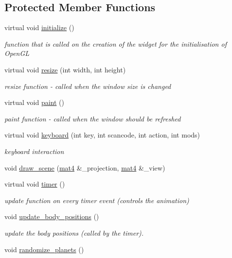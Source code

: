 \subsection*{Protected Member Functions}
\begin{DoxyCompactItemize}
\item 
virtual void \hyperlink{classSolar__viewer_ad995310e4ede7e0ade07a6b6fb799488}{initialize} ()
\begin{DoxyCompactList}\small\item\em function that is called on the creation of the widget for the initialisation of Open\+GL \end{DoxyCompactList}\item 
virtual void \hyperlink{classSolar__viewer_a40df69388b641e5982f0975d711ae3ca}{resize} (int width, int height)
\begin{DoxyCompactList}\small\item\em resize function -\/ called when the window size is changed \end{DoxyCompactList}\item 
virtual void \hyperlink{classSolar__viewer_ab0c48ceb8d58aefee8c5528c9efa6412}{paint} ()
\begin{DoxyCompactList}\small\item\em paint function -\/ called when the window should be refreshed \end{DoxyCompactList}\item 
virtual void \hyperlink{classSolar__viewer_aaf4e3bd2fd0dea72ffafe050a3c2ef7f}{keyboard} (int key, int scancode, int action, int mods)
\begin{DoxyCompactList}\small\item\em keyboard interaction \end{DoxyCompactList}\item 
void \hyperlink{classSolar__viewer_af6b468fb543b9c9ed466fe1687f1aff8}{draw\+\_\+scene} (\hyperlink{classmat4}{mat4} \&\+\_\+projection, \hyperlink{classmat4}{mat4} \&\+\_\+view)
\item 
virtual void \hyperlink{classSolar__viewer_a1b9915ee3f62232328c7326753c11101}{timer} ()
\begin{DoxyCompactList}\small\item\em update function on every timer event (controls the animation) \end{DoxyCompactList}\item 
void \hyperlink{classSolar__viewer_ab86b680afd2e29e8ead0ae9bdb2cef48}{update\+\_\+body\+\_\+positions} ()
\begin{DoxyCompactList}\small\item\em update the body positions (called by the timer). \end{DoxyCompactList}\item 
void \hyperlink{classSolar__viewer_aa88b398265ff4e938fd522426e1d7333}{randomize\+\_\+planets} ()
\end{DoxyCompactItemize}
